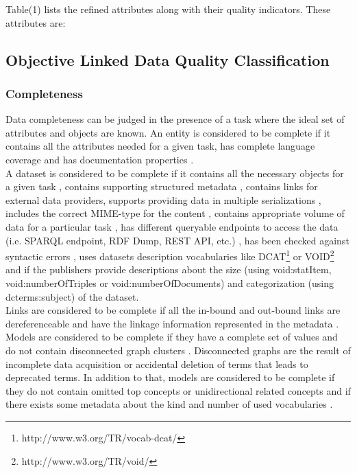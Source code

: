 \documentclass[onecolumn, crcready]{iosart2c}
\begin{document}
Table(1) lists the refined attributes along with their quality indicators. These attributes are:

\subsection{Objective Linked Data Quality Classification}
 \subsubsection{Completeness}

Data completeness can be judged in the presence of a task where the ideal set of attributes and objects are known. An entity is considered to be complete if it contains all the attributes needed for a given task, has complete language coverage \cite{Mader2012} and has documentation properties \cite{w3c_skos_rec}\cite{Mader2012}.\\ A dataset is considered to be complete if it contains all the necessary objects for a given task \cite{Mendes2012}, contains supporting structured metadata \cite{Hogan2010}, contains links for external data providers, supports providing data in multiple serializations \cite{Framework2012}, includes the correct MIME-type for the content \cite{Hogan2010}, contains appropriate volume of data for a particular task \cite{Framework2012}, has different queryable endpoints to access the data (i.e. SPARQL endpoint, RDF Dump, REST API, etc.) \cite{Framework2012}, has been checked against syntactic errors \cite{Hogan2010}, uses datasets description vocabularies like DCAT\footnote{http://www.w3.org/TR/vocab-dcat/} or VOID\footnote{http://www.w3.org/TR/void/} and if the publishers provide descriptions about the size (using void:statItem, void:numberOfTriples or void:numberOfDocuments) and categorization (using dcterms:subject) of the dataset.\\ Links are considered to be complete if all the in-bound and out-bound links are dereferenceable \cite{Hogan2010}\cite{Mader2012}\cite{Gueret2012} and have the linkage information represented in the metadata \cite{Hogan2010}.\\ Models are considered to be complete if they have a complete set of values \cite{Mader2012} and do not contain disconnected graph clusters \cite{Mader2012}. Disconnected graphs are the result of incomplete data acquisition or accidental deletion of terms that leads to deprecated terms. In addition to that, models are considered to be complete if they do not contain omitted top concepts or unidirectional related concepts \cite{Hogan2010} and if there exists some metadata about the kind and number of used vocabularies \cite{Framework2012}.
\end{document}
